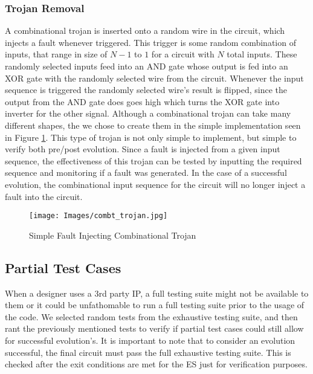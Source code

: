 \documentclass[conference]{IEEEtran}
\begin{document}
{\subsubsection{Trojan Removal}
\par A combinational trojan is inserted onto a random wire in the circuit, which injects a fault whenever triggered. 
This trigger is some random combination of inputs, that range in size of $N-1$ to $1$ for a circuit with $N$ total inputs.
These randomly selected inputs feed into an AND gate whose output is fed into an XOR gate with the randomly selected wire from the circuit. 
Whenever the input sequence is triggered the randomly selected wire's result is flipped, since the output from the AND gate does goes high which turns the XOR gate into inverter for the other signal. 
Although a combinational trojan can take many different shapes, the we chose to create them in the simple implementation seen in Figure \ref{fig:comb_trojan}.
This type of trojan is not only simple to implement, but simple to verify both pre/post evolution. 
Since a fault is injected from a given input sequence, the effectiveness of this trojan can be tested by inputting the required sequence and monitoring if a fault was generated.
In the case of a successful evolution, the combinational input sequence for the circuit will no longer inject a fault into the circuit.

\begin{figure}[t]
    \centering
    \texttt{[image: Images/combt\_trojan.jpg]}
    \caption{Simple Fault Injecting Combinational Trojan}
    \label{fig:comb_trojan}
\end{figure}

\subsection{Partial Test Cases}
\par When a designer uses a 3rd party IP, a full testing suite might not be available to them or it could be unfathomable to run a full testing suite prior to the usage of the code.
We selected random tests from the exhaustive testing suite, and then rant the previously mentioned tests to verify if partial test cases could still allow for successful evolution's. 
It is important to note that to consider an evolution successful, the final circuit must pass the full exhaustive testing suite.
This is checked after the exit conditions are met for the ES just for verification purposes.

}
\end{document}
